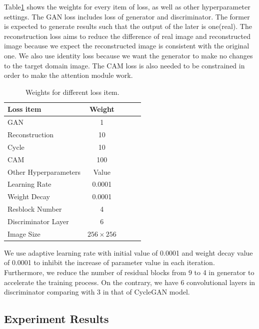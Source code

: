 \documentclass{article}
\begin{document}
Table\ref{tab:loss} shows the weights for every item of loss, as well as other hyperparameter settings. The GAN loss includes loss of generator and discriminator. The former is expected to generate results such that the output of the later is one(real). The reconstruction loss aims to reduce the difference of real image and reconstructed image because we expect the reconstructed image is consistent with the original one. We also use identity loss because we want the generator to make no changes to the target domain image. The CAM loss is also needed to be constrained in order to make the attention module work.


\begin{table}[tb]
\vskip 3mm
\begin{center}
\begin{small}
\begin{sc}
\begin{tabular}{lcccr}
\hline
Loss item & Weight \\
\hline
GAN & 1\\
Reconstruction & 10\\
Cycle & 10\\
CAM & 100\\
\hline
Other Hyperparameters & Value\\
\hline
Learning Rate & 0.0001\\
Weight Decay & 0.0001\\
Resblock Number & 4\\
Discriminator Layer & 6\\
Image Size & $256 \times 256$\\
\hline
\end{tabular}
\end{sc}
\caption{Weights for different loss item.}
\label{tab:loss}
\end{small}
\end{center}
\vskip -3mm
\end{table}

We use adaptive learning rate with initial value of 0.0001 and weight decay value of 0.0001 to inhibit the increase of parameter value in each iteration. Furthermore, we reduce the number of residual blocks from 9 to 4 in generator to accelerate the training process. On the contrary, we have 6 convolutional layers in discriminator comparing with 3 in that of CycleGAN model.

\subsection{Experiment Results}
\end{document}
